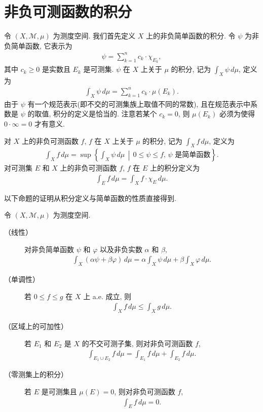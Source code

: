 \documentclass[../../main.tex]{subfiles}
\begin{document}
\section{非负可测函数的积分}\label{section:ch18-nonnegative-integral}

令 $(X,\mathcal{M},\mu)$ 为测度空间. 我们首先定义 $X$ 上的非负简单函数的积分. 令 $\psi$ 为非负简单函数, 它表示为
\begin{align*}
\psi=\sum_{k=1}^{n}c_{k}\cdot\chi_{E_{k}},
\end{align*}
其中 $c_{k}\geqslant 0$ 是实数且 $E_{k}$ 是可测集. $\psi$ 在 $X$ 上关于 $\mu$ 的积分, 记为 $\int_{X}\psi\,d\mu$, 定义为
\begin{align}
\int_{X}\psi\,d\mu=\sum_{k=1}^{n}c_{k}\cdot\mu(E_{k}).\label{align:ch18-simple-integral}
\end{align}
由于 $\psi$ 有一个规范表示(即不交的可测集族上取值不同的常数), 且在规范表示中系数是 $\psi$ 的取值, 积分的定义是恰当的. 注意若某个 $c_{k}=0$, 则 $\mu(E_{k})$ 必须为使得 $0\cdot\infty=0$ 才有意义.

对 $X$ 上的非负可测函数 $f$, $f$ 在 $X$ 上关于 $\mu$ 的积分, 记为 $\int_{X}f\,d\mu$, 定义为
\begin{align}
\int_{X}f\,d\mu=\sup\left\{\int_{X}\psi\,d\mu\,\middle|\,0\leqslant\psi\leqslant f,\,\psi\text{ 是简单函数}\right\}.\label{align:ch18-nonneg-integral-def}
\end{align}
对可测集 $E$ 和 $X$ 上的非负可测函数 $f$, $f$ 在 $E$ 上的积分定义为
\begin{align*}
\int_{E}f\,d\mu=\int_{X}f\cdot\chi_{E}\,d\mu.
\end{align*}

以下命题的证明从积分定义与简单函数的性质直接得到.

\begin{proposition}\label{proposition:ch18-integral-basic}
令 $(X,\mathcal{M},\mu)$ 为测度空间.
\begin{description}
\item[（线性）] 对非负简单函数 $\psi$ 和 $\varphi$ 以及非负实数 $\alpha$ 和 $\beta$,
\begin{align*}
\int_{X}(\alpha\psi+\beta\varphi)\,d\mu=\alpha\int_{X}\psi\,d\mu+\beta\int_{X}\varphi\,d\mu.
\end{align*}
\item[（单调性）] 若 $0\leqslant f\leqslant g$ 在 $X$ 上 a.e. 成立, 则
\begin{align*}
\int_{X}f\,d\mu\leqslant\int_{X}g\,d\mu.
\end{align*}
\item[（区域上的可加性）] 若 $E_{1}$ 和 $E_{2}$ 是 $X$ 的不交可测子集, 则对非负可测函数 $f$,
\begin{align*}
\int_{E_{1}\cup E_{2}}f\,d\mu=\int_{E_{1}}f\,d\mu+\int_{E_{2}}f\,d\mu.
\end{align*}
\item[（零测集上的积分）] 若 $E$ 是可测集且 $\mu(E)=0$, 则对非负可测函数 $f$,
\begin{align*}
\int_{E}f\,d\mu=0.
\end{align*}
\end{description}
\end{proposition}
\end{document}
